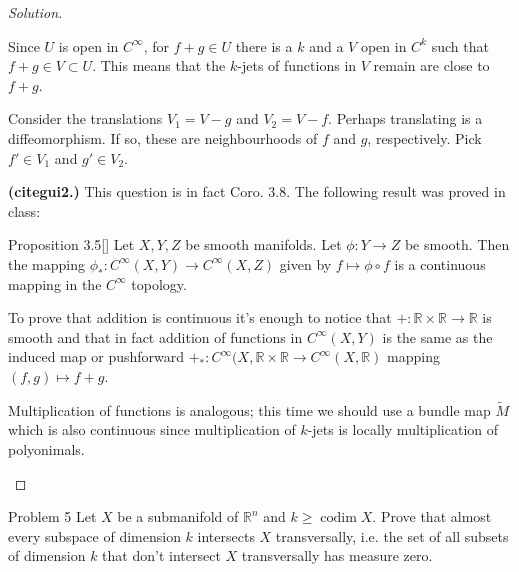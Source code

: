 \begin{proof}[Solution]
\begin{enumerate}[label=(\alph*)]
	Since \(U\) is open in \(C^\infty\), for \(f+g \in U\) there is a \(k\) and a \(V\) open in \(C^k\) such that \(f + g \in V \subset U\). This means that the \(k\)-jets of functions in \(V\) remain are close to \(f+g\).

	Consider the translations \(V_1=V-g\) and \(V_2=V-f\). Perhaps translating is a diffeomorphism. If so, these are neighbourhoods of \(f\) and \(g\), respectively. Pick \(f' \in V_1\) and \(g' \in V_2\).

	
	\textbf{(cite{gui2}.)} This question is in fact Coro. 3.8. The following result was proved in class:

	\begin{thing6}{Proposition 3.5}[\cite{gui2}]\label{prop:3.5}\leavevmode
Let \(X,Y,Z\) be smooth manifolds. Let \(\phi:Y \to Z\) be smooth. Then the mapping \(\phi_*:C^\infty (X,Y) \to C^\infty(X,Z)\) given by \(f \mapsto \phi \circ f\) is a continuous mapping in the \(C^\infty\) topology.
	\end{thing6}
	To prove that addition is continuous it's enough to notice that \(+: \mathbb{R} \times \mathbb{R} \to \mathbb{R}\) is smooth and that in fact addition of functions in \(C^\infty(X,Y)\) is the same as the induced map or pushforward \(+_*:C^\infty(X,\mathbb{R} \times \mathbb{R} \to C^\infty(X,\mathbb{R})\) mapping \((f,g) \mapsto f+g\).\fi

	Multiplication of functions is analogous; this time we should use a bundle map \(\tilde{M}\) which is also continuous since multiplication of \(k\)-jets is locally multiplication of polyonimals.
\end{enumerate}
\end{proof}

\begin{thing1}{Problem 5}\label{prob:5}\leavevmode
Let \(X\) be a submanifold of \(\mathbb{R}^n\) and \(k \geq  \operatorname{codim}X\). Prove that almost every subspace of dimension \(k\) intersects \(X\) transversally, i.e. the set of all subsets of dimension \(k\) that don't intersect \(X\) transversally has measure zero.
\end{thing1}

